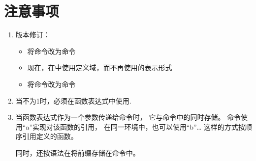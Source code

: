 \documentclass[../main.tex]{subfiles}
\begin{document}
\section{注意事项}

\begin{enumerate}
\item 版本修订：
  \begin{itemize}
   \item 将命令改为命令
   \item 现在，在\TIKZ{}中使用定义域，而不再使用的表示形式
   \item 将命令改为命令
  \end{itemize}

\item 当不为1时，必须在函数表达式中使用.
\item 当函数表达式作为一个参数传递给命令时，
	它与命令中的同时存储。
	命令使用\enquote{a}实现对该函数的引用，
	在同一环境中，也可以使用\enquote{b}\dots{}
	这样的方式按顺序引用定义的函数。

	同时，还按语法在将前缀存储在命令中。


\end{enumerate}
\end{document}
